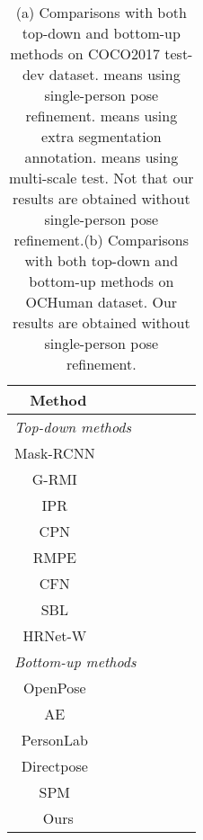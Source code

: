 \documentclass[runningheads]{llncs}
\begin{document}
	
	\begin{table}[t]
		\centering
		\caption{(a) Comparisons with both top-down and bottom-up methods on COCO2017 test-dev dataset.  means using single-person pose refinement.  means using extra segmentation annotation.  means using multi-scale test. Not that our results are obtained without single-person pose refinement.(b) Comparisons with both top-down and bottom-up methods on OCHuman dataset. Our results are obtained without single-person pose refinement.} 
		\begin{subtable}[b]{0.45\textwidth}
			\centering
			\tiny
			\begin{tabular}{c|c|c|c|c|c|c}
				\hline  
				Method &   &  &  &  &  & \\
				\hline
				\multicolumn{7}{l}{\emph{Top-down methods}}\\
				\hline
				Mask-RCNN~\cite{he2017mask}&  & &&&&\\
				G-RMI~\cite{papandreou2017towards} & & &&&&\\
				IPR~\cite{sun2018integral}  & & &&&&\\
				CPN~\cite{chen2018cascaded}  &  & &&&&\\
				RMPE~\cite{fang2017rmpe}  & & &&&&\\
				CFN~\cite{huang2017coarse}  &  & &&&&\\
				SBL~\cite{xiao2018simple} & & &&&&\\
				HRNet-W~\cite{sun2019deep} & &&&&&\\ \hline
				\multicolumn{7}{l}{\emph{Bottom-up methods}}\\
				\hline
				OpenPose~\cite{cao2017realtime} & & &&&&\\
				AE~\cite{newell2017associative}  & & &&&&\\
				PersonLab~\cite{papandreou2018personlab}  & & &&&&\\
				Directpose~\cite{tian2019directpose} &  &  & & &&\\
				SPM~\cite{nie2019single}  & & &&&&\\
				Ours &&&&&&\\ \hline \hline
			\end{tabular}
			

\end{subtable}
\end{table}
\end{document}
